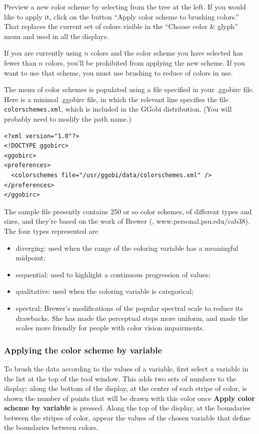\documentclass[11pt]{article}
\begin{document}
Preview a new color scheme by selecting from the tree at the left.
If you would like to apply it, click on the button ``Apply color scheme
to brushing colors.''  That replaces the current set of colors visible
in the ``Choose color \& glyph'' menu and used in all the displays.

If you are currently using $n$ colors and the color scheme you have
selected has fewer than $n$ colors, you'll be prohibited from applying
the new scheme.  If you want to use that scheme, you must use brushing
to reduce of colors in use.

The menu of color schemes is populated using a file specified in your
.ggobirc file.  Here is a minimal .ggobirc file, in which the relevant
line specifies the file {\tt colorschemes.xml}, which is included in the
GGobi distribution.  (You will probably need to modify the path name.)

\begin{verbatim}
<?xml version="1.0"?>
<!DOCTYPE ggobirc>
<ggobirc>
<preferences>
  <colorschemes file="/usr/ggobi/data/colorschemes.xml" />
</preferences>
</ggobirc>
\end{verbatim}

The sample file presently contains 250 or so color schemes, of
different types and sizes, and they're based on the work of
Brewer (\cite{Brewer99}, www.personal.psu.edu/cab38).
The four types represented are

\begin{itemize}
\item diverging: used when the range of the coloring variable has
      a meaningful midpoint;
\item sequential: used to highlight a continuous progression of values;
\item qualitative: used when the coloring variable is categorical;
\item spectral: Brewer's modifications of the popular spectral scale
      to reduce its drawbacks.  She has made the perceptual steps
      more uniform, and made the scales more friendly for people with
      color vision impairments.
\end{itemize}

\subsubsection{Applying the color scheme by variable}

To brush the data according to the values of a variable, first select
a variable in the list at the top of the tool window.  This adds two
sets of numbers to the display:  along the bottom of the display, at
the center of each stripe of color, is shown the number of points that
will be drawn with this color once {\bf Apply color scheme by variable}
is pressed.  Along the top of the display, at the boundaries between the
stripes of color, appear the values of the chosen variable that define
the boundaries between colors. 
\end{document}
